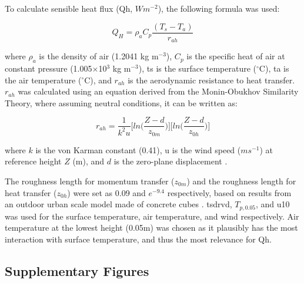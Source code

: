 \documentclass[final,3p,times,authoryear]{elsarticle}
\begin{document}
To calculate sensible heat flux (\gls{Qh}, $Wm^{-2}$), the following formula was used:

\begin{equation}
Q_{H} = \rho_{a}C_{p} \frac{ (T_{s} - T_{a}) }{r_{ah}}
\label{eq:7.12}
\end{equation}

where $\rho_{a}$ is the density of air (1.2041 kg m$^{-3}$), $C_{p}$ is the specific heat of air at constant pressure (1.005$\times$10$^{3}$ kg m$^{-3}$), \gls{ts} is the surface temperature ($^{\circ}$C), \gls{ta} is the air temperature ($^{\circ}$C), and $r_{ah}$ is the aerodynamic resistance to heat transfer. $r_{ah}$ was calculated using an equation derived from the Monin-Obukhov Similarity Theory, where assuming neutral conditions, it can be written as:

\begin{equation}
r_{ah} = \frac{1}{k^{2}u}\bigg[ln\bigg( \frac{Z-d}{z_{0m}} \bigg) \bigg] \bigg[ln\bigg( \frac{Z-d}{z_{0h}} \bigg) \bigg]
\label{eq:7.13}
\end{equation}

where $k$ is the von Karman constant (0.41), \gls{u} is the wind speed ($ms^{-1}$) at reference
height $Z$ (m), and $d$ is the zero-plane displacement \citep{Liu2007}.

The roughness length for momentum transfer ($z_{0m}$) and the roughness length for heat transfer ($z_{0h}$) were set as 0.09 and $e^{-9.4}$ respectively, based on results from an outdoor urban scale model made of concrete cubes \citep{Kanda2007}. \gls{tsdrvd}, $T_{p,0.05}$, and \gls{u10} was used for the surface temperature, air temperature, and wind respectively. Air temperature at the lowest height (0.05m) was chosen as it plausibly has the most interaction with surface temperature, and thus the most relevance for \gls{Qh}.


\subsection{Supplementary Figures}\label{sec:suppfig}
\end{document}
